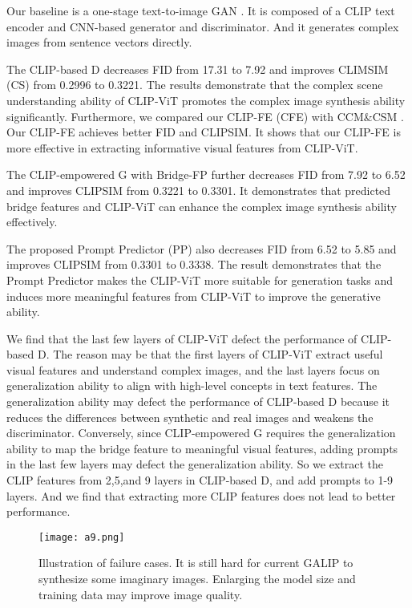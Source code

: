 \documentclass[10pt,twocolumn,letterpaper]{article}
\begin{document}
 Our baseline is a one-stage text-to-image GAN \cite{tao2020df}.
It is composed of a CLIP text encoder and CNN-based generator and discriminator.
And it generates complex images from sentence vectors directly.

 The CLIP-based D decreases FID from 17.31 to 7.92 and improves CLIMSIM (CS) from 0.2996 to 0.3221. 
The results demonstrate that the complex scene understanding ability of CLIP-ViT promotes the complex image synthesis ability significantly.
Furthermore, we compared our CLIP-FE (CFE) with CCM\&CSM \cite{sauer2021projected}. 
Our CLIP-FE achieves better FID and CLIPSIM.
It shows that our CLIP-FE is more effective in extracting informative visual features from CLIP-ViT.


 The CLIP-empowered G with Bridge-FP further decreases FID from 7.92 to 6.52 and improves CLIPSIM from 0.3221 to 0.3301. 
It demonstrates that predicted bridge features and CLIP-ViT can enhance the complex image synthesis ability effectively.

 The proposed Prompt Predictor (PP) also decreases FID from 6.52 to 5.85 and improves CLIPSIM from 0.3301 to 0.3338. 
The result demonstrates that the Prompt Predictor makes the CLIP-ViT more suitable for generation tasks and induces more meaningful features from CLIP-ViT to improve the generative ability.

 We find that the last few layers of CLIP-ViT defect the performance of CLIP-based D.
The reason may be that the first layers of CLIP-ViT extract useful visual features and understand complex images, 
and the last layers focus on generalization ability to align with high-level concepts in text features.
The generalization ability may defect the performance of CLIP-based D because it reduces the differences between synthetic and real images and weakens the discriminator.
Conversely, since CLIP-empowered G requires the generalization ability to map the bridge feature to meaningful visual features, adding prompts in the last few layers may defect the generalization ability.
So we extract the CLIP features from 2,5,and 9 layers in CLIP-based D, and add prompts to 1-9 layers.
And we find that extracting more CLIP features does not lead to better performance.


\begin{figure}[t] \small
  \centering
  \texttt{[image: a9.png]}
  \caption{Illustration of failure cases. It is still hard for current GALIP to synthesize some imaginary images. Enlarging the model size and training data may improve image quality.}
  \label{fig8}
  \vspace{-0.4cm}
\end{figure}
\end{document}
